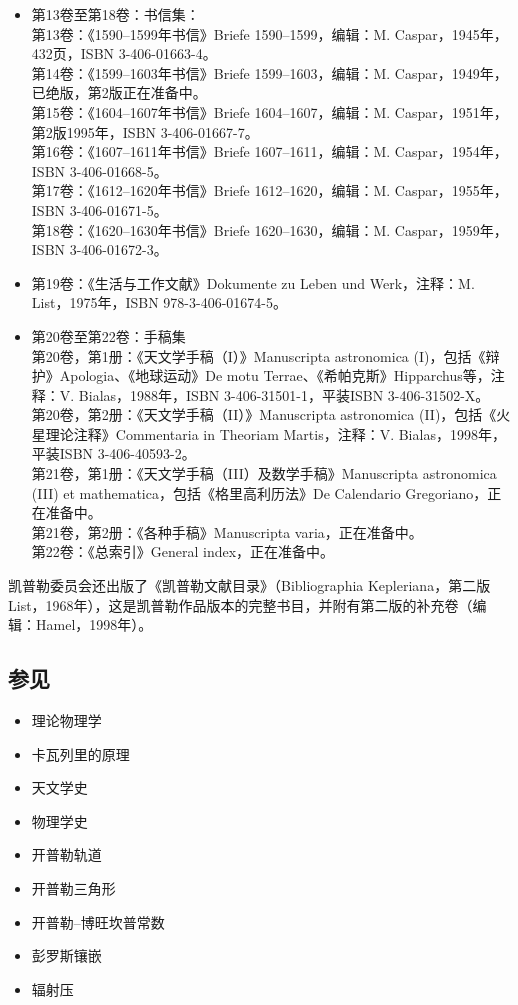 \begin{itemize}
\item 第13卷至第18卷：书信集：\\
第13卷：《1590–1599年书信》Briefe 1590–1599，编辑：M. Caspar，1945年，432页，ISBN 3-406-01663-4。\\
第14卷：《1599–1603年书信》Briefe 1599–1603，编辑：M. Caspar，1949年，已绝版，第2版正在准备中。\\
第15卷：《1604–1607年书信》Briefe 1604–1607，编辑：M. Caspar，1951年，第2版1995年，ISBN 3-406-01667-7。\\
第16卷：《1607–1611年书信》Briefe 1607–1611，编辑：M. Caspar，1954年，ISBN 3-406-01668-5。\\
第17卷：《1612–1620年书信》Briefe 1612–1620，编辑：M. Caspar，1955年，ISBN 3-406-01671-5。\\
 第18卷：《1620–1630年书信》Briefe 1620–1630，编辑：M. Caspar，1959年，ISBN 3-406-01672-3。\\

\item 第19卷：《生活与工作文献》Dokumente zu Leben und Werk，注释：M. List，1975年，ISBN 978-3-406-01674-5。

\item 第20卷至第22卷：手稿集\\
第20卷，第1册：《天文学手稿（I）》Manuscripta astronomica (I)，包括《辩护》Apologia、《地球运动》De motu Terrae、《希帕克斯》Hipparchus等，注释：V. Bialas，1988年，ISBN 3-406-31501-1，平装ISBN 3-406-31502-X。\\
第20卷，第2册：《天文学手稿（II）》Manuscripta astronomica (II)，包括《火星理论注释》Commentaria in Theoriam Martis，注释：V. Bialas，1998年，平装ISBN 3-406-40593-2。\\
第21卷，第1册：《天文学手稿（III）及数学手稿》Manuscripta astronomica (III) et mathematica，包括《格里高利历法》De Calendario Gregoriano，正在准备中。\\
第21卷，第2册：《各种手稿》Manuscripta varia，正在准备中。\\
第22卷：《总索引》General index，正在准备中。\\
\end{itemize}
凯普勒委员会还出版了《凯普勒文献目录》（Bibliographia Kepleriana，第二版List，1968年），这是凯普勒作品版本的完整书目，并附有第二版的补充卷（编辑：Hamel，1998年）。
\subsection{参见}
\begin{itemize}
\item 理论物理学
\item 卡瓦列里的原理
\item 天文学史
\item 物理学史
\item 开普勒轨道
\item 开普勒三角形
\item 开普勒–博旺坎普常数
\item 彭罗斯镶嵌
\item 辐射压
\end{itemize}

